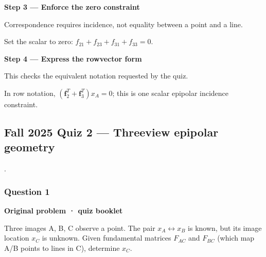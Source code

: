 \documentclass[letterpaper,11pt,english,openany,oneside]{jupyterBook}
\begin{document}
\par

\par\medskip{}
{\color{QuizStepRed}\bfseries Step 3 — Enforce the zero constraint}\par\smallskip

\sphinxAtStartPar
{} Correspondence requires incidence, not equality between a point and a line.

\sphinxAtStartPar
Set the scalar to zero: {\color{QuizMathBlue} \(\boxed{f_{21}+f_{23}+f_{31}+f_{33}=0}\)}.

\par

\par\medskip{}
{\color{QuizStepRed}\bfseries Step 4 — Express the row\sphinxhyphen{}vector form}\par\smallskip

\sphinxAtStartPar
{} This checks the equivalent notation requested by the quiz.

\sphinxAtStartPar
In row notation, {\color{QuizMathBlue} \(\boxed{(\mathbf f_2^T+\mathbf f_3^T)x_A=0}\)}; this is one scalar epipolar incidence constraint.

\par


\subsection{Fall 2025 Quiz 2 — Three\sphinxhyphen{}view epipolar geometry}
\label{\detokenize{lectures/lecture04/quiz-workbook:fall-2025-quiz-2-three-view-epipolar-geometry}}\label{\detokenize{lectures/lecture04/quiz-workbook:quiz-source-3}}
\sphinxAtStartPar
{} .


\subsubsection{Question 1}
\label{\detokenize{lectures/lecture04/quiz-workbook:question-1}}\label{\detokenize{lectures/lecture04/quiz-workbook:quiz-3-q1}}\label{\detokenize{lectures/lecture04/quiz-workbook:ex-lec04-third-view}}
\par\medskip\textbf{Original problem · quiz booklet}\par\smallskip

\sphinxAtStartPar
Three images A, B, C observe a point. The pair \(x_A\leftrightarrow x_B\) is known, but its image location \(x_C\) is unknown. Given fundamental matrices \(F_{AC}\) and \(F_{BC}\) (which map A/B points to lines in C), determine \(x_C\).
\end{document}
